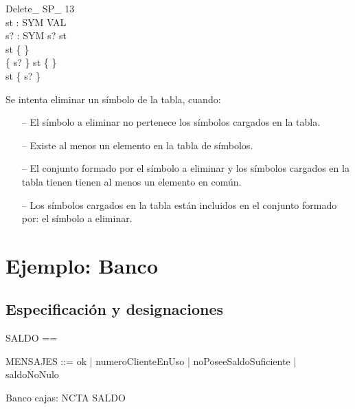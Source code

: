 \begin{schema}{Delete\_ SP\_ 13}\\
 st : SYM \pfun VAL \\
 s? : SYM 
\where
 s? \notin \dom st \\
 st \neq \{ \} \\
 \{ s? \} \cap \dom st \neq \{ \} \\
 \dom st \subset \{ s? \}
\end{schema}

\begin{tcolorbox}[colback=gray!5!white,colframe=gray!50!black,
  colbacktitle=gray!75!black,title=Delete\_ SP\_ 13]
  Se intenta eliminar un símbolo de la tabla, cuando:
     \begin{itemize}
        \item[--]{El símbolo a eliminar no pertenece los símbolos cargados en la tabla.}
        \item[--]{Existe al menos un elemento en la tabla de símbolos.}
        \item[--]{El conjunto formado por el símbolo a eliminar y los símbolos cargados en la tabla tienen tienen al menos un elemento en común.}
        \item[--]{Los símbolos cargados en la tabla están incluidos en el conjunto formado por: el símbolo a eliminar.}
     \end{itemize}
\end{tcolorbox}

\section*{Ejemplo: Banco}

\subsection*{Especificación y designaciones}

\begin{zed}
[NCTA] \also

SALDO == \nat \also

MENSAJES ::= ok | numeroClienteEnUso | noPoseeSaldoSuficiente | saldoNoNulo
\end{zed}

\begin{schema}{Banco}
cajas: NCTA \pfun SALDO
\end{schema}


